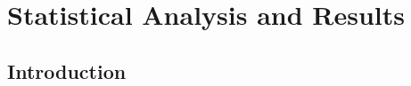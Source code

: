 
\chapter{Statistical Analysis and Results}
\label{chap:statistical}

\newpage

\section{Introduction}

